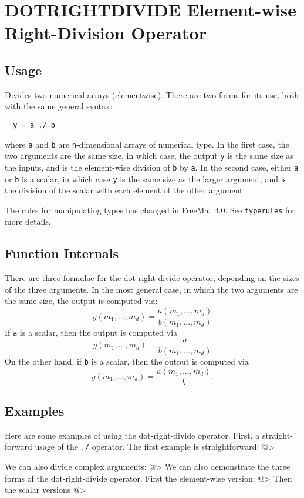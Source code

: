 \section{DOTRIGHTDIVIDE Element-wise Right-Division Operator}

\subsection{Usage}

Divides two numerical arrays (elementwise).  There are two forms
for its use, both with the same general syntax:
\begin{verbatim}
  y = a ./ b
\end{verbatim}
where \verb|a| and \verb|b| are \verb|n|-dimensional arrays of numerical type.  In the
first case, the two arguments are the same size, in which case, the 
output \verb|y| is the same size as the inputs, and is the element-wise
division of \verb|b| by \verb|a|.  In the second case, either \verb|a| or \verb|b| is a scalar, 
in which case \verb|y| is the same size as the larger argument,
and is the division of the scalar with each element of the other argument.

The rules for manipulating types has changed in FreeMat 4.0.  See \verb|typerules|
for more details.

\subsection{Function Internals}

There are three formulae for the dot-right-divide operator, depending on the
sizes of the three arguments.  In the most general case, in which 
the two arguments are the same size, the output is computed via:
\[
y(m_1,\ldots,m_d) = \frac{a(m_1,\ldots,m_d)}{b(m_1,\ldots,m_d)}
\]
If \verb|a| is a scalar, then the output is computed via
\[
y(m_1,\ldots,m_d) = \frac{a}{b(m_1,\ldots,m_d)}
\]
On the other hand, if \verb|b| is a scalar, then the output is computed via
\[
y(m_1,\ldots,m_d) = \frac{a(m_1,\ldots,m_d)}{b}.
\]
\subsection{Examples}

Here are some examples of using the dot-right-divide operator.  First, a 
straight-forward usage of the \verb|./| operator.  The first example
is straightforward:
@>

We can also divide complex arguments:
@>
We can also demonstrate the three forms of the dot-right-divide operator.  First
the element-wise version:
@>
Then the scalar versions
@>
